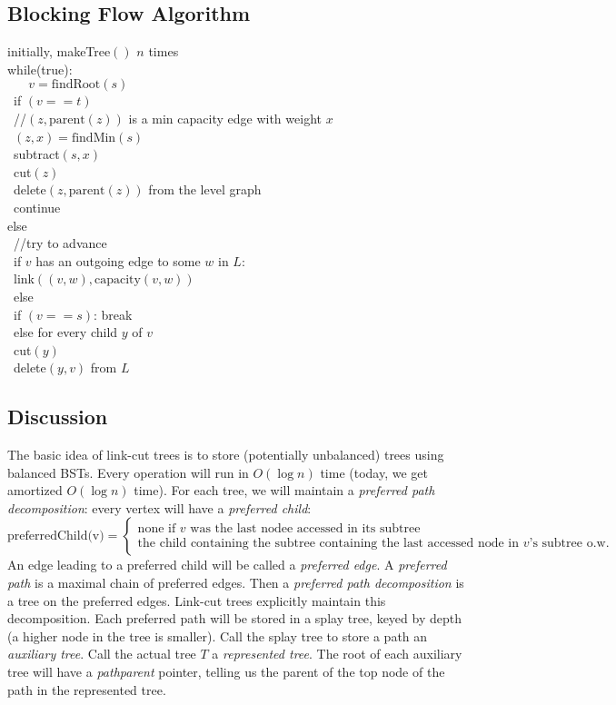 \documentclass[11pt]{article}
\begin{document}
\subsection{Blocking Flow Algorithm}
initially, makeTree$()$ $n$ times
\\
while(true):
\\
$\mbox{ }\quad v=\mbox{findRoot}(s)$
\\
\mbox{ }\quad if $(v==t)$
\\
\mbox{ }\quad //$(z,\mbox{parent}(z))$ is a min capacity edge with weight $x$
\\
\mbox{ }\quad $(z,x)=\mbox{findMin}(s)$
\\
\mbox{ }\quad subtract$(s,x)$
\\
\mbox{ }\quad cut$(z)$
\\
\mbox{ }\quad delete$(z,\mbox{parent}(z))$ from the level graph
\\
\mbox{ }\quad continue
\\
else
\\
\mbox{ }\quad //try to advance
\\
\mbox{ }\quad if $v$ has an outgoing edge to some $w$ in $L$:
\\
\mbox{ }\quad\quad link$((v,w),\mbox{capacity}(v,w))$
\\
\mbox{ }\quad else
\\
\mbox{ }\quad \quad if $(v==s)$: break
\\
\mbox{ }\quad \quad else for every child $y$ of $v$
\\
\mbox{ }\quad \quad \quad cut$(y)$
\\
\mbox{ }\quad \quad \quad delete$(y,v)$ from $L$

\subsection{Discussion}
The basic idea of link-cut trees is to store (potentially unbalanced) trees using balanced BSTs. Every operation will run in $O(\log n)$ time (today, we get amortized $O(\log n)$ time). For each tree, we will maintain a \emph{preferred path decomposition}: every vertex will have a \emph{preferred child}:
$$\mbox{preferredChild(v)}=\begin{cases} 
\mbox{none if $v$ was the last nodee accessed in its subtree} \\
\mbox{the child containing the subtree containing the last accessed node in $v$'s subtree o.w.}
\end{cases}$$
An edge leading to a preferred child will be called a \emph{preferred edge}. A \emph{preferred path} is a maximal chain of preferred edges. Then a \emph{preferred path decomposition} is a tree on the preferred edges. Link-cut trees explicitly maintain this decomposition. Each preferred path will be stored in a splay tree, keyed by depth (a higher node in the tree is smaller). Call the splay tree to store a path an \emph{auxiliary tree}. Call the actual tree $T$ a \emph{represented tree}. The root of each auxiliary tree will have a \emph{pathparent} pointer, telling us the parent of the top node of the path in the represented tree.
\end{document}
